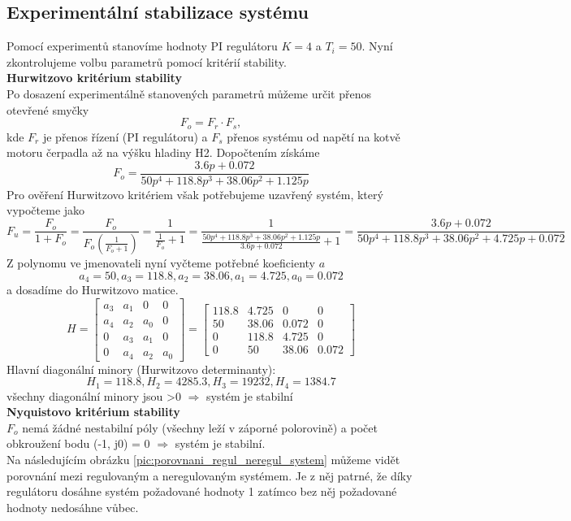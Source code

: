 \documentclass{article}
\begin{document}
		\subsection{Experimentální stabilizace systému}
			Pomocí experimentů stanovíme hodnoty PI regulátoru \(K=4\) a \(T_{i}=50\). Nyní zkontrolujeme volbu parametrů pomocí kritérií stability.\\
			\textbf{Hurwitzovo kritérium stability}\\
			Po dosazení experimentálně stanovených parametrů můžeme určit přenos otevřené smyčky
			\[F_{o}=F_{r}\cdot F_{s},\]
			kde \(F_{r}\) je přenos řízení (PI regulátoru) a \(F_{s}\) přenos systému od napětí na kotvě motoru čerpadla až na výšku hladiny H2. Dopočtením získáme
			\[F_{o}=\frac{3.6p + 0.072}{50p^{4} + 118.8p^{3} + 38.06p^{2} + 1.125p}\]
			Pro ověření Hurwitzovo kritériem však potřebujeme uzavřený systém, který vypočteme jako
			\[F_{u}=\frac{F_{o}}{1+F_{o}}=\frac{F_{o}}{F_{o}(\frac{1}{F_{o}+1})}=\frac{1}{\frac{1}{F_{o}}+1}=\frac{1}{\frac{50p^{4} + 118.8p^{3} + 38.06p^{2} + 1.125p}{3.6p + 0.072}+1}=\frac{3.6p + 0.072}{50p^{4} + 118.8p^{3} + 38.06p^{2} + 4.725p + 0.072}\]
			Z polynomu ve jmenovateli nyní vyčteme potřebné koeficienty \(a\)
			\[a_{4}=50, a_{3}=118.8, a_{2}=38.06, a_{1}=4.725, a_{0}=0.072\]
			a dosadíme do Hurwitzovo matice.
			\[H=\begin{bmatrix}
				a_{3}&a_{1}&0&0\\
				a_{4}&a_{2}&a_{0}&0\\
				0&a_{3}&a_{1}&0\\
				0&a_{4}&a_{2}&a_{0}
			\end{bmatrix}=\begin{bmatrix}
				118.8&4.725&0&0\\
				50&38.06&0.072&0\\
				0&118.8&4.725&0\\
				0&50&38.06&0.072
			\end{bmatrix}\]
			Hlavní diagonální minory (Hurwitzovo determinanty):
			\[H_{1}=118.8, H_{2}=4285.3, H_{3}=19232, H_{4}=1384.7\]
			\hspace{5cm} všechny diagonální minory jsou \textgreater 0 $\Rightarrow$ systém je stabilní\\
			\textbf{Nyquistovo kritérium stability}\\
			\(F_{o}\) nemá žádné nestabilní póly (všechny leží v záporné polorovině) a počet obkroužení bodu  (-1, j0) = 0 $\Rightarrow$ systém je stabilní.\\
			Na následujícím obrázku \ref{pic:porovnani_regul_neregul_system} můžeme vidět porovnání mezi regulovaným a neregulovaným systémem. Je z něj patrné, že díky regulátoru dosáhne systém požadované hodnoty 1 zatímco bez něj požadované hodnoty nedosáhne vůbec.\\
\end{document}
